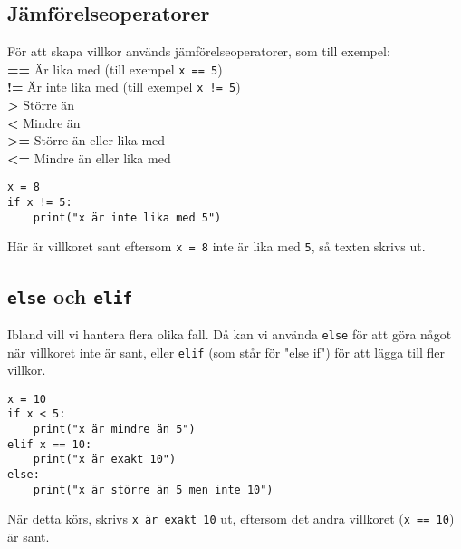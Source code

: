 \subsection{Jämförelseoperatorer}
För att skapa villkor används jämförelseoperatorer, som till exempel:\\
\textbf{==} Är lika med (till exempel \texttt{x == 5})\\
\textbf{!=} Är inte lika med (till exempel \texttt{x != 5})\\
\textbf{>} Större än\\
\textbf{<} Mindre än\\
\textbf{>=} Större än eller lika med\\
\textbf{<=} Mindre än eller lika med\\


\begin{lstlisting}[title=Exempel med jämförelseoperatorer]
x = 8
if x != 5:
    print("x är inte lika med 5")
\end{lstlisting}

Här är villkoret sant eftersom \texttt{x = 8} inte är lika med \texttt{5}, så texten skrivs ut.

\subsection{\texttt{else} och \texttt{elif}}
Ibland vill vi hantera flera olika fall. Då kan vi använda \texttt{else} för att göra något när villkoret inte är sant, eller \texttt{elif} (som står för "else if") för att lägga till fler villkor.

\begin{lstlisting}[title=Exempel med else och elif]
x = 10
if x < 5:
    print("x är mindre än 5")
elif x == 10:
    print("x är exakt 10")
else:
    print("x är större än 5 men inte 10")
\end{lstlisting}

När detta körs, skrivs \texttt{x är exakt 10} ut, eftersom det andra villkoret (\texttt{x == 10}) är sant.


